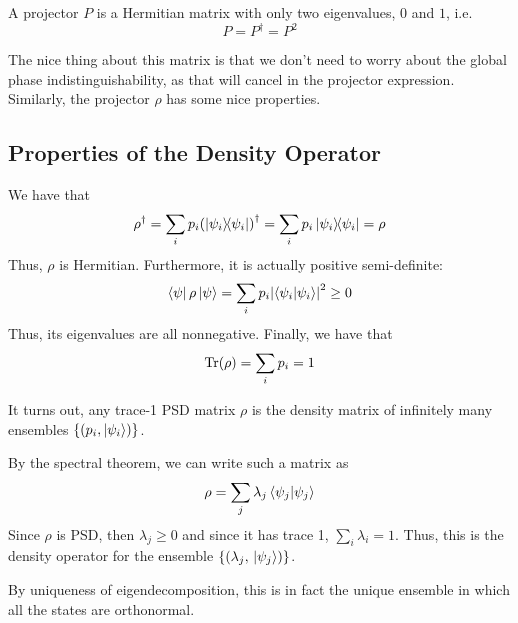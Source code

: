\begin{definition}[Projector]
    A projector $P$ is a Hermitian matrix with only two eigenvalues, $0$ and $1$, i.e.
    \[ P = P^{\dagger} = P^2 \]
\end{definition}

The nice thing
about this matrix is that we don't need to worry about the global phase indistinguishability, as that will cancel in the
projector expression. Similarly, the projector $\rho$ has some nice properties.

\subsection{Properties of the Density Operator}

We have that
\[ \rho^{\dagger} = \sum_i p_i \qty(\ketbra{\psi_i}{\psi_i})^{\dagger} = \sum_i p_i \ketbra{\psi_i}{\psi_i} = \rho \]
Thus, $\rho$ is Hermitian. Furthermore, it is actually positive semi-definite:
\[ \bra{\psi} \rho \ket{\psi} = \sum_i p_i \qty|\braket{\psi_i}{\psi_i}|^2 \geq 0 \]
Thus, its eigenvalues are all nonnegative. Finally, we have that
\[ \Tr(\rho) = \sum_i p_i = 1 \]

\begin{theorem}
It turns out, any trace-1 PSD matrix $\rho$ is the density matrix of infinitely many
ensembles $\{(p_i, \ket{\psi_i})\}$.

\begin{proof*}
By the spectral theorem, we can write
such a matrix as
\[ \rho = \sum_j \lambda_j \braket{\psi_j}{\psi_j} \]
Since $\rho$ is PSD, then $\lambda_j \geq 0$ and since it has trace 1, $\sum_{i} \lambda_i = 1$.
Thus, this is the density operator for the ensemble $\{(\lambda_j, \ket*{\psi_j})\}$.

By uniqueness of eigendecomposition, this is in fact the unique ensemble in which all the states
are orthonormal.
\end{proof*}
\end{theorem}

